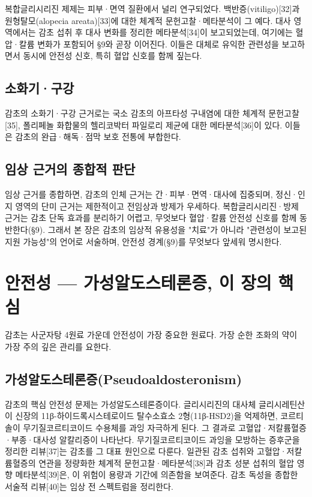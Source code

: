 \documentclass[12pt,oneside]{book}
\begin{document}
복합글리시리진 제제는 피부·면역 질환에서 널리 연구되었다. 백반증(vitiligo)[32]과 원형탈모(alopecia areata)[33]에 대한 체계적 문헌고찰·메타분석이 그 예다. 대사 영역에서는 감초 섭취 후 대사 변화를 정리한 메타분석[34]이 보고되었는데, 여기에는 혈압·칼륨 변화가 포함되어 §9와 곧장 이어진다. 이들은 대체로 유익한 관련성을 보고하면서 동시에 안전성 신호, 특히 혈압 신호를 함께 짚는다.

\subsection{소화기·구강}

감초의 소화기·구강 근거로는 국소 감초의 아프타성 구내염에 대한 체계적 문헌고찰[35], 폴리페놀 화합물의 헬리코박터 파일로리 제균에 대한 메타분석[36]이 있다. 이들은 감초의 완급·해독·점막 보호 전통에 부합한다.

\subsection{임상 근거의 종합적 판단}

임상 근거를 종합하면, 감초의 인체 근거는 간·피부·면역·대사에 집중되며, 정신·인지 영역의 단미 근거는 제한적이고 전임상과 방제가 우세하다. 복합글리시리진·방제 근거는 감초 단독 효과를 분리하기 어렵고, 무엇보다 혈압·칼륨 안전성 신호를 함께 동반한다(§9). 그래서 본 장은 감초의 임상적 유용성을 "치료"가 아니라 "관련성이 보고된 지원 가능성"의 언어로 서술하며, 안전성 경계(§9)를 무엇보다 앞세워 명시한다.

\section{안전성 — 가성알도스테론증, 이 장의 핵심}

감초는 사군자탕 4원료 가운데 안전성이 가장 중요한 원료다. 가장 순한 조화의 약이 가장 주의 깊은 관리를 요한다.

\subsection{가성알도스테론증(Pseudoaldosteronism)}

감초의 핵심 안전성 문제는 가성알도스테론증이다. 글리시리진의 대사체 글리시레틴산이 신장의 11β-하이드록시스테로이드 탈수소효소 2형(11β-HSD2)을 억제하면, 코르티솔이 무기질코르티코이드 수용체를 과잉 자극하게 된다. 그 결과로 고혈압·저칼륨혈증·부종·대사성 알칼리증이 나타난다. 무기질코르티코이드 과잉을 모방하는 증후군을 정리한 리뷰[37]는 감초를 그 대표 원인으로 다룬다. 일관된 감초 섭취와 고혈압·저칼륨혈증의 연관을 정량화한 체계적 문헌고찰·메타분석[38]과 감초 성분 섭취의 혈압 영향 메타분석[39]은, 이 위험이 용량과 기간에 의존함을 보여준다. 감초 독성을 종합한 서술적 리뷰[40]는 임상 전 스펙트럼을 정리한다.
\end{document}
